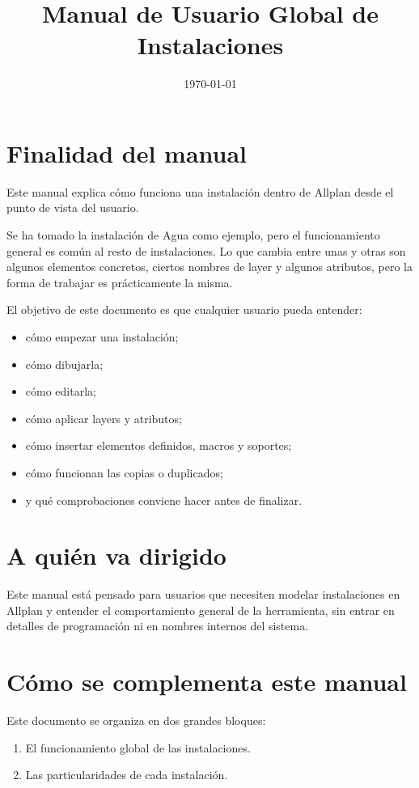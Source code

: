 \documentclass[12pt,a4paper]{article}
\title{Manual de Usuario Global de Instalaciones}
\author{}
\date{\today}
\begin{document}
\maketitle
\tableofcontents
\newpage

\section{Finalidad del manual}

Este manual explica cómo funciona una instalación dentro de Allplan desde el punto de vista del usuario.

Se ha tomado la instalación de Agua como ejemplo, pero el funcionamiento general es común al resto de instalaciones. Lo que cambia entre unas y otras son algunos elementos concretos, ciertos nombres de layer y algunos atributos, pero la forma de trabajar es prácticamente la misma.

El objetivo de este documento es que cualquier usuario pueda entender:

\begin{itemize}
\item cómo empezar una instalación;
\item cómo dibujarla;
\item cómo editarla;
\item cómo aplicar layers y atributos;
\item cómo insertar elementos definidos, macros y soportes;
\item cómo funcionan las copias o duplicados;
\item y qué comprobaciones conviene hacer antes de finalizar.
\end{itemize}

\section{A quién va dirigido}

Este manual está pensado para usuarios que necesiten modelar instalaciones en Allplan y entender el comportamiento general de la herramienta, sin entrar en detalles de programación ni en nombres internos del sistema.

\section{Cómo se complementa este manual}

Este documento se organiza en dos grandes bloques:

\begin{enumerate}
\item El funcionamiento global de las instalaciones.
\item Las particularidades de cada instalación.
\end{enumerate}
\end{document}

